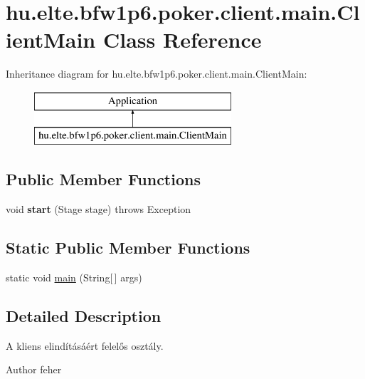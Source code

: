 \hypertarget{classhu_1_1elte_1_1bfw1p6_1_1poker_1_1client_1_1main_1_1_client_main}{}\section{hu.\+elte.\+bfw1p6.\+poker.\+client.\+main.\+Client\+Main Class Reference}
\label{classhu_1_1elte_1_1bfw1p6_1_1poker_1_1client_1_1main_1_1_client_main}
Inheritance diagram for hu.\+elte.\+bfw1p6.\+poker.\+client.\+main.\+Client\+Main\+:\begin{figure}[H]
\begin{center}
\leavevmode
\includegraphics[height=2.000000cm]{classhu_1_1elte_1_1bfw1p6_1_1poker_1_1client_1_1main_1_1_client_main}
\end{center}
\end{figure}
\subsection*{Public Member Functions}
\begin{DoxyCompactItemize}
\item 
\hypertarget{classhu_1_1elte_1_1bfw1p6_1_1poker_1_1client_1_1main_1_1_client_main_afd78a84f8364952891d6d71c9a86d5f8}{}void {\bfseries start} (Stage stage)  throws Exception \label{classhu_1_1elte_1_1bfw1p6_1_1poker_1_1client_1_1main_1_1_client_main_afd78a84f8364952891d6d71c9a86d5f8}

\end{DoxyCompactItemize}
\subsection*{Static Public Member Functions}
\begin{DoxyCompactItemize}
\item 
static void \hyperlink{classhu_1_1elte_1_1bfw1p6_1_1poker_1_1client_1_1main_1_1_client_main_a1da6b62125b225a716afd6572d939b64}{main} (String\mbox{[}$\,$\mbox{]} args)
\end{DoxyCompactItemize}


\subsection{Detailed Description}
A kliens elindításáért felelős osztály. \begin{DoxyAuthor}{Author}
feher 
\end{DoxyAuthor}


